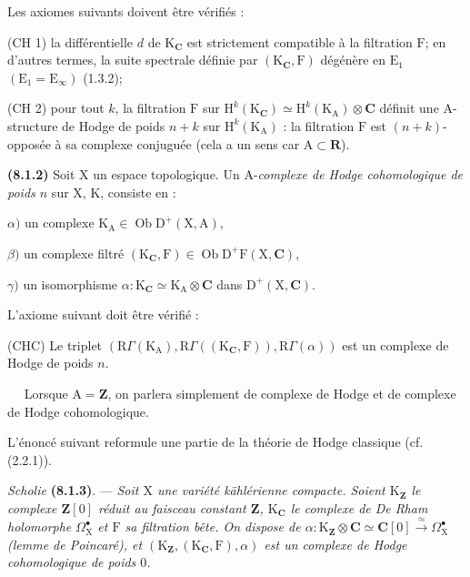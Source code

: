 \documentclass[11pt,leqno]{article}
\newcommand{\Page}[1]{\ifvmode\noindent\else\unskip\ \fi{\footnotesize\textcolor{gray}{[p.\,#1]}}\ \ignorespaces}
\begin{document}
Les axiomes suivants doivent être vérifiés :

\noindent
(CH 1) la différentielle \(d\) de \(\mathrm{K}_{\mathbf{C}}\) est strictement compatible à la filtration \(\mathrm{F}\); en d’autres termes, la suite spectrale définie par \((\mathrm{K}_{\mathbf{C}},\mathrm{F})\) dégénère en \(\mathrm{E}_1\) \((\mathrm{E}_1=\mathrm{E}_{\infty})\) (1.3.2);

\noindent
(CH 2) pour tout \(k\), la filtration \(\mathrm{F}\) sur \(\mathrm{H}^{k}(\mathrm{K}_{\mathbf{C}})\simeq\mathrm{H}^{k}(\mathrm{K}_{\mathrm{A}})\otimes\mathbf{C}\) définit une \(\mathrm{A}\)-structure de Hodge de poids \(n+k\) sur \(\mathrm{H}^{k}(\mathrm{K}_{\mathrm{A}})\) : la filtration \(\mathrm{F}\) est \((n+k)\)-opposée à sa complexe conjuguée (cela a un sens car \(\mathrm{A}\subset\mathbf{R}\)).

\textbf{(8.1.2)} Soit \(\mathrm{X}\) un espace topologique. Un \(\mathrm{A}\)-\textit{complexe de Hodge cohomologique de poids \(n\)} sur \(\mathrm{X}\), \(\mathrm{K}\), consiste en :

\noindent
\(\alpha)\) un complexe \(\mathrm{K}_{\mathrm{A}}\in\operatorname{Ob}\mathrm{D}^{+}(\mathrm{X},\mathrm{A})\),

\noindent
\(\beta)\) un complexe filtré \((\mathrm{K}_{\mathbf{C}},\mathrm{F})\in\operatorname{Ob}\mathrm{D}^{+}\mathrm{F}(\mathrm{X},\mathbf{C})\),

\noindent
\(\gamma)\) un isomorphisme \(\alpha:\mathrm{K}_{\mathbf{C}}\simeq\mathrm{K}_{\mathrm{A}}\otimes\mathbf{C}\) dans \(\mathrm{D}^{+}(\mathrm{X},\mathbf{C})\).

L’axiome suivant doit être vérifié :

\noindent
(CHC) Le triplet \((\mathrm{R}\Gamma(\mathrm{K}_{\mathrm{A}}),\mathrm{R}\Gamma((\mathrm{K}_{\mathbf{C}},\mathrm{F})),\mathrm{R}\Gamma(\alpha))\) est un complexe de Hodge de poids \(n\).

\Page{29}
Lorsque \(\mathrm{A}=\mathbf{Z}\), on parlera simplement de complexe de Hodge et de complexe de Hodge cohomologique.

L’énoncé suivant reformule une partie de la théorie de Hodge classique (cf. (2.2.1)).

\textit{Scholie} \textbf{(8.1.3)}. — \textit{Soit \(\mathrm{X}\) une variété kählérienne compacte. Soient \(\mathrm{K}_{\mathbf{Z}}\) le complexe \(\mathbf{Z}[0]\) réduit au faisceau constant \(\mathbf{Z}\), \(\mathrm{K}_{\mathbf{C}}\) le complexe de De Rham holomorphe \(\Omega_{\mathrm{X}}^\bullet\) et \(\mathrm{F}\) sa filtration bête. On dispose de \(\alpha:\mathrm{K}_{\mathbf{Z}}\otimes\mathbf{C}\simeq\mathbf{C}[0]\xrightarrow{\approx}\Omega_{\mathrm{X}}^\bullet\) (lemme de Poincaré), et \((\mathrm{K}_{\mathbf{Z}},(\mathrm{K}_{\mathbf{C}},\mathrm{F}),\alpha)\) est un complexe de Hodge cohomologique de poids \(0\).}
\end{document}

